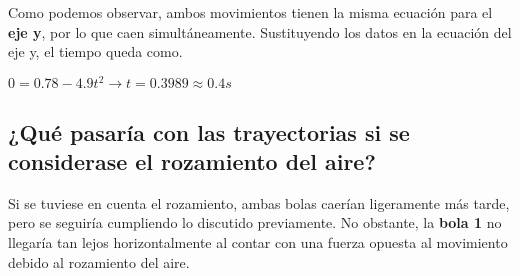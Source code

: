 \documentclass[]{scrartcl}
\begin{document}
Como podemos observar, ambos movimientos tienen la misma ecuación para el \textbf{eje y}, por lo que caen simultáneamente. Sustituyendo los datos en la ecuación del eje y, el tiempo queda como.

\begin{centering}
$0=0.78-4.9t^{2} \rightarrow t=0.3989\approx 0.4 s$\\
\end{centering}

\subsection{¿Qué pasaría con las trayectorias si se considerase el rozamiento del aire?}

Si se tuviese en cuenta el rozamiento, ambas bolas caerían ligeramente más tarde, pero se seguiría cumpliendo lo discutido previamente. No obstante, la \textbf{bola 1} no llegaría tan lejos horizontalmente al contar con una fuerza opuesta al movimiento debido al rozamiento del aire.
\end{document}
